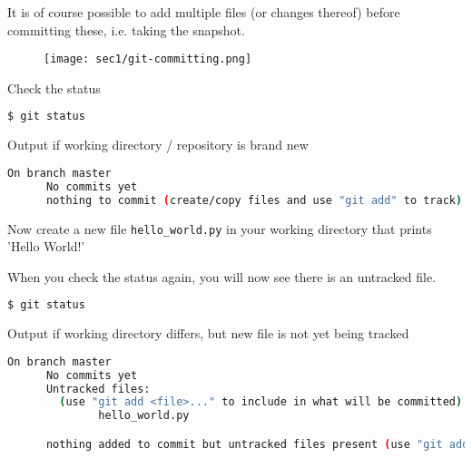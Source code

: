 \begin{frame}[fragile]
\emptyframetitle

  It is of course possible to add multiple files (or changes thereof) before committing these, i.e. taking the snapshot.

  \begin{figure}[h]
    \texttt{[image: sec1/git-committing.png]}
  \end{figure}

\end{frame}

\begin{frame}[fragile]
\emptyframetitle

  Check the status
  \begin{lstlisting}[language=bash]
  $ git status
  \end{lstlisting}

  \begin{block}{Output if working directory / repository is brand new}
    \begin{lstlisting}[language=bash]
      On branch master
      No commits yet
      nothing to commit (create/copy files and use "git add" to track)
    \end{lstlisting}
  \end{block}

  \vspace{0.5cm}
  Now create a new file \texttt{hello\_world.py} in your working directory that prints 'Hello World!'

\end{frame}

\begin{frame}[fragile]
\emptyframetitle
  When you check the status again, you will now see there is an untracked file.
  \begin{lstlisting}[language=bash]
  $ git status
  \end{lstlisting}

  \begin{block}{Output if working directory differs, but new file is not yet being tracked}
    \begin{lstlisting}[language=bash]
      On branch master
      No commits yet
      Untracked files:
        (use "git add <file>..." to include in what will be committed)
              hello_world.py

      nothing added to commit but untracked files present (use "git add" to track)
    \end{lstlisting}
  \end{block}

\end{frame}


